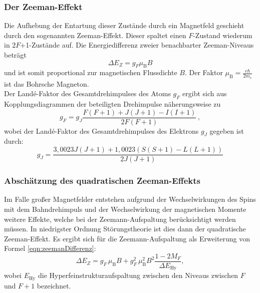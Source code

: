 \subsubsection{Der Zeeman-Effekt}
Die Aufhebung der Entartung dieser Zustände durch ein Magnetfeld geschieht durch den sogenannten Zeeman-Effekt. Dieser spaltet einen $F$-Zustand wiederum in $2F$+1-Zustände auf. Die Energiedifferenz zweier benachbarter Zeeman-Niveaus beträgt
\begin{equation}
\Delta E_Z = g_F \mu_{\text{B}} B
\label{eqn:zeemanDifferenz}
\end{equation}
und ist somit proportional zur magnetischen Flussdichte $B$. Der Faktor $\mu_{\text{B}} = \frac{e \hbar}{2m_e}$ ist das Bohrsche Magneton.\\
Der Landé-Faktor des Gesamtdrehimpulses des Atoms $g_F$ ergibt sich aus Kopplungsdiagrammen der beteiligten Drehimpulse näherungsweise zu
\begin{equation}
g_F = g_J \frac{F(F+1)+J(J+1)-I(I+1)}{2F(F+1)}\,,
\label{eqn:g_F_Theorie}
\end{equation}
wobei der Landé-Faktor des Gesamtdrehimpulses des Elektrons $g_J$ gegeben ist durch:
\begin{equation}
g_J = \frac{3{,}0023J(J+1)+1{,}0023(S(S+1)-L(L+1))}{2J(J+1)}
\label{eqn:g_J_Theorie}
\end{equation}

\subsubsection{Abschätzung des quadratischen Zeeman-Effekts}
\label{subsec:quadratischerZeeman}

Im Falle großer Magnetfelder entstehen aufgrund der Wechselwirkungen des Spins mit dem Bahndrehimpuls und der Wechselwirkung der magnetischen Momente weitere Effekte, welche bei der Zeemann-Aufspaltung berücksichtigt werden müssen. In niedrigster Ordnung Störungstheorie ist dies dann der quadratische Zeeman-Effekt.
Es ergibt sich für die Zeemann-Aufspaltung als Erweiterung von Formel \eqref{eqn:zeemanDifferenz}:
\begin{equation}
\Delta E_Z = g_F \, \mu_{\text{B}} B + g_F^2 \, \mu_{\text{B}}^2 B^2 \frac{1-2M_F}{\Delta E_{\text{Hy}}},
\label{eqn:zeemanDifferenzQuadratisch}
\end{equation}
wobei $E_\text{Hy}$ die Hyperfeinstrukturaufspaltung zwischen den Niveaus zwischen $F$ und $F+1$ bezeichnet.


